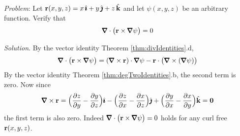 \begin{eg}\label{eg:vecIdA}
\noindent\textit{Problem}:
Let $\mathbf{r}(x,y,z) = x\,\hat{\pmb{\imath}}+y\,\hat{\pmb{\jmath}}+z\,\hat{\mathbf{k}}$ and let $\psi(x,y,z)$ be an arbitrary
function. Verify that
\begin{equation*}
\vnabla\cdot\big(\vr\times\vnabla\psi\big) = 0
\end{equation*}

\medskip
\noindent\textit{Solution}. By the vector identity 
Theorem \ref{thm:divIdentities}.d,
\begin{align*}
\vnabla\cdot\big(\vr\times\vnabla\psi\big)
=(\vnabla\times\vr)\cdot\vnabla \psi
  -\vr\cdot\big(\vnabla\times(\vnabla\psi)\big)
\end{align*}
By the vector identity Theorem \ref{thm:degTwoIdentities}.b, 
the second term is zero. Now since
\begin{equation*}
\vnabla\times\vr 
= \Big(\frac{\partial z}{\partial y} -\frac{\partial y}{\partial z}\Big)\hi
-\Big(\frac{\partial z}{\partial x} -\frac{\partial x}{\partial z}\Big)\hj
+\Big(\frac{\partial y}{\partial x} -\frac{\partial x}{\partial y}\Big)\hk
=\vZero
\end{equation*}
the first term is also zero. Indeed 
$\vnabla\cdot\big(\vr\times\vnabla\psi\big) = 0$ 
holds for any curl free $\mathbf{r}(x,y,z)$.

\end{eg}

